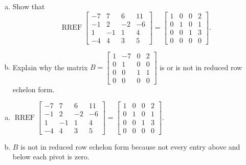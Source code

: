 
\begin{exerciseStatement}

\begin{enumerate}[(a)]
\item Show that \[\operatorname{RREF} \left[\begin{array}{cccc}
-7 & 7 & 6 & 11 \\
-1 & 2 & -2 & -6 \\
1 & -1 & 1 & 4 \\
-4 & 4 & 3 & 5
\end{array}\right] = \left[\begin{array}{cccc}
1 & 0 & 0 & 2 \\
0 & 1 & 0 & 1 \\
0 & 0 & 1 & 3 \\
0 & 0 & 0 & 0
\end{array}\right] .\]
\item Explain why the matrix \(B= \left[\begin{array}{cccc}
1 & -7 & 0 & 2 \\
0 & 1 & 0 & 0 \\
0 & 0 & 1 & 1 \\
0 & 0 & 0 & 0
\end{array}\right] \) is or is not in reduced row echelon form.
\end{enumerate}
    
\end{exerciseStatement}
    
\begin{exerciseAnswer} 

\begin{enumerate}[(a)]
\item \(\operatorname{RREF} \left[\begin{array}{cccc}
-7 & 7 & 6 & 11 \\
-1 & 2 & -2 & -6 \\
1 & -1 & 1 & 4 \\
-4 & 4 & 3 & 5
\end{array}\right] = \left[\begin{array}{cccc}
1 & 0 & 0 & 2 \\
0 & 1 & 0 & 1 \\
0 & 0 & 1 & 3 \\
0 & 0 & 0 & 0
\end{array}\right] .\)
\item \(B\) is not in reduced row echelon form because not every entry above and below each pivot is zero. 
\end{enumerate}
    
\end{exerciseAnswer}
    
